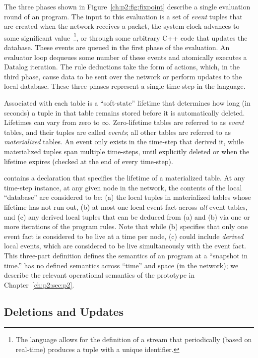 The three phases shown in Figure~\ref{ch:p2:fig:fixpoint} describe a single
evaluation round of an \OVERLOG program.  The input to this evaluation is a set
of {\em event} tuples that are created when the network receives a packet, the
system clock advances to some significant value~\footnote{The \OVERLOG language
allows for the definition of a stream that periodically (based on real-time)
produces a tuple with a unique identifier.}, or through some arbitrary C++ code
that updates the database.  These events are queued in the first phase of the
evaluation.  An evaluator loop dequeues some number of these events and
atomically executes a Datalog iteration.  The rule deductions take the form
of actions, which, in the third phase, cause data to be sent over the network
or perform updates to the local database.  These three phases represent a
single time-step in the \OVERLOG language.

Associated with each \OVERLOG table is a ``soft-state'' lifetime that
determines how long (in seconds) a tuple in that table remains stored before it
is automatically deleted.  Lifetimes can vary from zero to $\infty$.
Zero-lifetime tables are referred to as {\em event} tables, and their tuples
are called {\em events}; all other tables are referred to as {\em materialized}
tables.  An event only exists in the time-step that derived it, while
materialized tuples span multiple time-steps, until explicitly deleted or when
the lifetime expires (checked at the end of every time-step).

\OVERLOG contains a  declaration that specifies the lifetime of
a materialized table.  At any time-step instance, at any given node in the
network, the contents of the local \OVERLOG ``database'' are considered to be:
(a) the local tuples in materialized tables whose lifetime has not run out, (b)
at most one local event fact across {\em all} event tables, and (c) any derived
local tuples that can be deduced from (a) and (b) via one or more iterations of
the program rules.  Note that while (b) specifies that only one event fact is
considered to be live at a time per node, (c) could include {\em derived} local
events, which are considered to be live simultaneously with the event fact.
This three-part definition defines the semantics of an \OVERLOG program at a
``snapshot in time.'' \OVERLOG has no defined semantics across ``time'' and
space (in the network); we describe the relevant operational semantics of the
prototype in Chapter~\ref{ch:p2:sec:p2}.
     
\subsection{Deletions and Updates}

